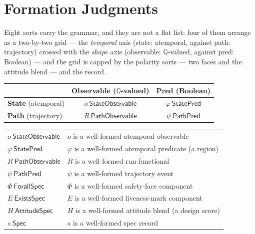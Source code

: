 \section{Formation Judgments}
\label{sec:spec-lang-formation}

Eight sorts carry the grammar, and they are not a flat list: four of
them arrange as a two-by-two grid --- the \emph{temporal} axis
(state: atemporal, against path: trajectory) crossed with the
\emph{shape} axis (observable: $\mathbb{Q}$-valued, against pred:
Boolean) --- and the grid is capped by the polarity sorts --- two
faces and the attitude blend --- and the record.

\begin{center}
\begin{tabular}{l|cc}
 & \textbf{Observable} ($\mathbb{Q}$-valued) & \textbf{Pred} (Boolean)\\
\hline
\textbf{State} (atemporal) & $o\ \mathsf{StateObservable}$ & $\varphi\ \mathsf{StatePred}$\\
\textbf{Path} (trajectory) & $R\ \mathsf{PathObservable}$ & $\psi\ \mathsf{PathPred}$\\
\end{tabular}
\end{center}

\begin{center}
\begin{tabular}{ll}
$o\ \mathsf{StateObservable}$ & $o$ is a well-formed atemporal observable\\
$\varphi\ \mathsf{StatePred}$ & $\varphi$ is a well-formed atemporal predicate (a region)\\
$R\ \mathsf{PathObservable}$ & $R$ is a well-formed run-functional\\
$\psi\ \mathsf{PathPred}$ & $\psi$ is a well-formed trajectory event\\
$\Phi\ \mathsf{ForallSpec}$ & $\Phi$ is a well-formed safety-face component\\
$E\ \mathsf{ExistsSpec}$ & $E$ is a well-formed liveness-mark component\\
$H\ \mathsf{AttitudeSpec}$ & $H$ is a well-formed attitude blend (a design score)\\
$s\ \mathsf{Spec}$ & $s$ is a well-formed spec record\\
\end{tabular}
\end{center}

